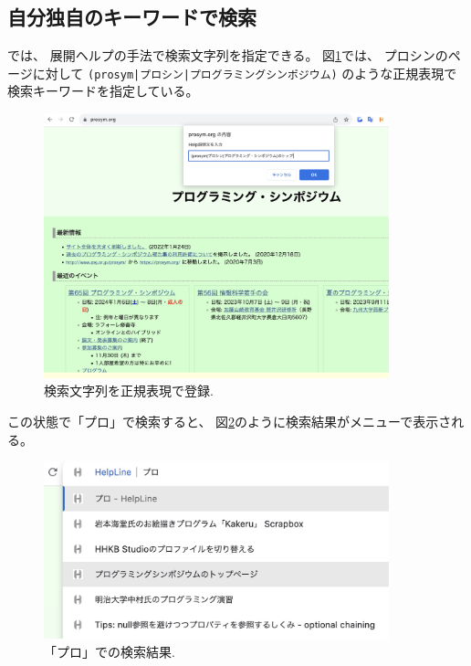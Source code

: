 \documentclass{ipsjprosym}
\begin{document}
\subsection{自分独自のキーワードで検索}
\label{mykw}

{\ds}では、
展開ヘルプ\cite{expandhelp}の手法で検索文字列を指定できる。
図\ref{register}では、
プロシンのページに対して
\verb+(prosym|プロシン|プログラミングシンポジウム)+
のような正規表現で検索キーワードを指定している。


\begin{figure}[h]
  \includegraphics[width=10cm,bb=0 0 2042 1566]{figures/b68d8c865c12932d5cbbea92c2d8605d.png}
  \caption{検索文字列を正規表現で登録.}
  \label{register}
\end{figure}

この状態で「プロ」で検索すると、
図\ref{result}のように検索結果がメニューで表示される。

\begin{figure}[h]
  \includegraphics[width=10cm,bb=0 0 1096 562]{figures/502c482135a43d72b8c1ac7d741a68c9.png}
  \caption{「プロ」での検索結果.}
  \label{result}
\end{figure}
\end{document}
